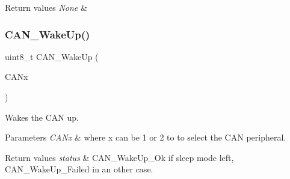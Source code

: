 \begin{DoxyRetVals}{Return values}
{\em None} & \\
\hline
\end{DoxyRetVals}
\mbox{\label{group___c_a_n___exported___functions_ga78cdfbf1884b9e33c552bcbca15bed10}} 
\subsubsection{\texorpdfstring{CAN\_WakeUp()}{CAN\_WakeUp()}}
{\footnotesize\ttfamily uint8\+\_\+t C\+A\+N\+\_\+\+Wake\+Up (\begin{DoxyParamCaption}\item[{\mbox{\hyperlink{struct_c_a_n___type_def}{C\+A\+N\+\_\+\+Type\+Def}} $\ast$}]{C\+A\+Nx }\end{DoxyParamCaption})}



Wakes the C\+AN up. 


\begin{DoxyParams}{Parameters}
{\em C\+A\+Nx} & where x can be 1 or 2 to to select the C\+AN peripheral. \\
\hline
\end{DoxyParams}

\begin{DoxyRetVals}{Return values}
{\em status} & C\+A\+N\+\_\+\+Wake\+Up\+\_\+\+Ok if sleep mode left, C\+A\+N\+\_\+\+Wake\+Up\+\_\+\+Failed in an other case. \\
\hline
\end{DoxyRetVals}
